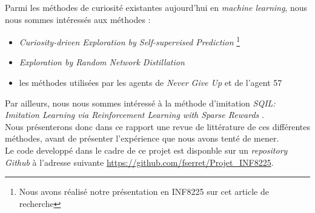 \documentclass[a4paper,12pt]{report}
\begin{document}
Parmi les méthodes de curiosité existantes aujourd'hui en \textit{machine learning}, nous nous sommes intéressés aux méthodes :
\begin{itemize}
    \item \textit{Curiosity-driven Exploration by Self-supervised Prediction} \cite{curiosity} \footnote{Nous avons réalisé notre présentation en INF8225 sur cet article de recherche}
    \item \textit{Exploration by Random Network Distillation} \cite{distillation}
    \item les méthodes utilisées par les agents de \textit{Never Give Up} \cite{ngu} et de l'agent 57 \cite{agent57}
\end{itemize}
Par ailleurs, nous nous sommes intéressé à la méthode d'imitation \textit{SQIL: Imitation Learning via Reinforcement Learning with Sparse Rewards} \cite{sqil}.\\

Nous présenterons donc dans ce rapport une revue de littérature de ces différentes méthodes, avant de présenter l'expérience que nous avons tenté de mener.\\

Le code developpé dans le cadre de ce projet est disponble sur un \textit{repository Github} à l'adresse suivante \url{https://github.com/fserret/Projet_INF8225}.
\end{document}
